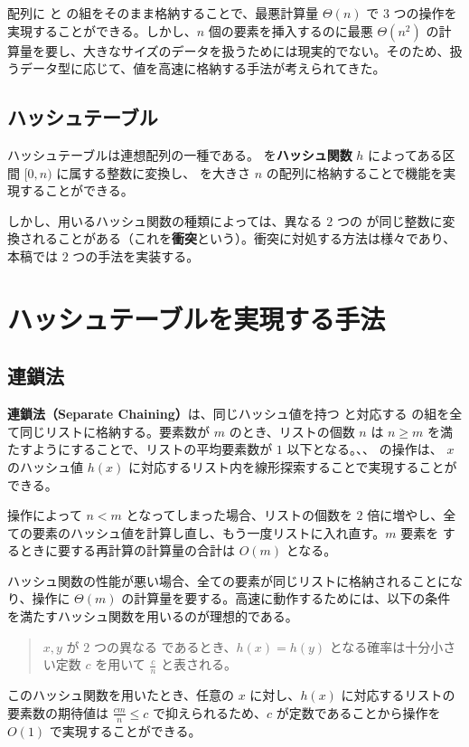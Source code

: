 \documentclass[dvipdfmx,a4j,10pt]{jarticle}
\begin{document}
配列に  と  の組をそのまま格納することで、最悪計算量 $\Theta (n)$ で $3$ つの操作を実現することができる。しかし、$n$ 個の要素を挿入するのに最悪 $\Theta (n^2)$ の計算量を要し、大きなサイズのデータを扱うためには現実的でない。そのため、扱うデータ型に応じて、値を高速に格納する手法が考えられてきた。

\subsection{ハッシュテーブル}

ハッシュテーブルは連想配列の一種である。 を\textbf{ハッシュ関数} $h$ によってある区間 $[0, n)$ に属する整数に変換し、 を大きさ $n$ の配列に格納することで機能を実現することができる。

しかし、用いるハッシュ関数の種類によっては、異なる $2$ つの  が同じ整数に変換されることがある（これを\textbf{衝突}という）。衝突に対処する方法は様々であり、本稿では $2$ つの手法を実装する。

\section{ハッシュテーブルを実現する手法}

\subsection{連鎖法}
\label{連鎖法}

\textbf{連鎖法（Separate Chaining）}\cite{データ構造}は、同じハッシュ値を持つ  と対応する  の組を全て同じリストに格納する。要素数が $m$ のとき、リストの個数 $n$ は $n \geq m$ を満たすようにすることで、リストの平均要素数が $1$ 以下となる。、、 の操作は、 $x$ のハッシュ値 $h(x)$ に対応するリスト内を線形探索することで実現することができる。

 操作によって $n < m$ となってしまった場合、リストの個数を $2$ 倍に増やし、全ての要素のハッシュ値を計算し直し、もう一度リストに入れ直す。$m$ 要素を  するときに要する再計算の計算量の合計は $O(m)$ となる。

ハッシュ関数の性能が悪い場合、全ての要素が同じリストに格納されることになり、操作に $\Theta (m)$ の計算量を要する。高速に動作するためには、以下の条件を満たすハッシュ関数を用いるのが理想的である。
\begin{quotation}
\noindent $x, y$ が $2$ つの異なる  であるとき、$h(x) = h(y)$ となる確率は十分小さい定数 $c$ を用いて $\displaystyle \frac{c}{n}$ と表される。
\end{quotation}
このハッシュ関数を用いたとき、任意の  $x$ に対し、$h(x)$ に対応するリストの要素数の期待値は $\displaystyle \frac{cm}{n} \leq c$ で抑えられるため、$c$ が定数であることから操作を $O(1)$ で実現することができる。
\end{document}
